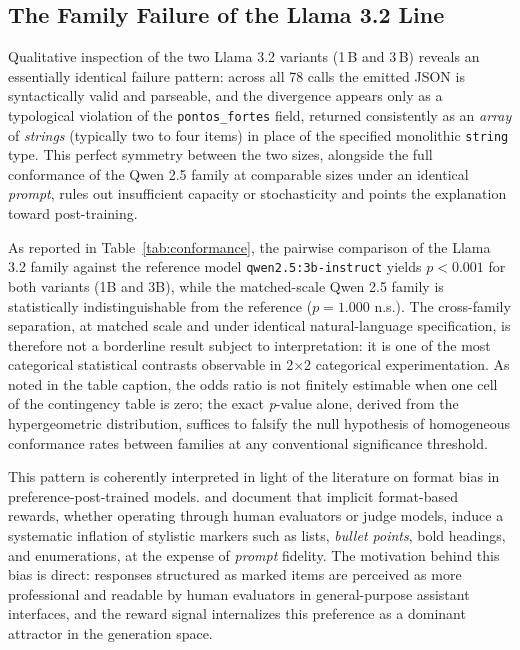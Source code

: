 \documentclass{sbc2023}%
\begin{document}
\subsection{The Family Failure of the Llama 3.2 Line}
\label{sec:llama-failure}

Qualitative inspection of the two Llama 3.2 variants (1\,B and 3\,B) reveals an essentially identical failure pattern: across all 78 calls the emitted JSON is syntactically valid and parseable, and the divergence appears only as a typological violation of the \texttt{pontos\_fortes} field, returned consistently as an \textit{array} of \textit{strings} (typically two to four items) in place of the specified monolithic \texttt{string} type. This perfect symmetry between the two sizes, alongside the full conformance of the Qwen 2.5 family at comparable sizes under an identical \textit{prompt}, rules out insufficient capacity or stochasticity and points the explanation toward post-training.

As reported in Table~\ref{tab:conformance}, the pairwise comparison of the Llama 3.2 family against the reference model \texttt{qwen2.5:3b-instruct} yields $p<0.001$ for both variants (1B and 3B), while the matched-scale Qwen 2.5 family is statistically indistinguishable from the reference ($p=1.000$ n.s.). The cross-family separation, at matched scale and under identical natural-language specification, is therefore not a borderline result subject to interpretation: it is one of the most categorical statistical contrasts observable in 2$\times$2 categorical experimentation. As noted in the table caption, the odds ratio is not finitely estimable when one cell of the contingency table is zero; the exact \textit{p}-value alone, derived from the hypergeometric distribution, suffices to falsify the null hypothesis of homogeneous conformance rates between families at any conventional significance threshold.

This pattern is coherently interpreted in light of the literature on format bias in preference-post-trained models. \citet{zheng2023judging} and \citet{wu2023style} document that implicit format-based rewards, whether operating through human evaluators or judge models, induce a systematic inflation of stylistic markers such as lists, \textit{bullet points}, bold headings, and enumerations, at the expense of \textit{prompt} fidelity. The motivation behind this bias is direct: responses structured as marked items are perceived as more professional and readable by human evaluators in general-purpose assistant interfaces, and the reward signal internalizes this preference as a dominant attractor in the generation space.
\end{document}
